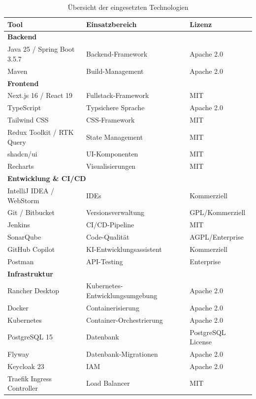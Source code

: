 \begin{table}[H]
\centering
\footnotesize
{}
\begin{tabularx}{\textwidth}{|p{3cm}|X|p{2.5cm}|}
\hline
\rowcolor{EDAGDunkelgrau!10}
\textbf{Tool} & \textbf{Einsatzbereich} & \textbf{Lizenz} \\ \hline

\multicolumn{3}{|l|}{\textbf{Backend}} \\ \hline
Java 25 / Spring Boot 3.5.7 & Backend-Framework & Apache 2.0 \\ \hline
Maven & Build-Management & Apache 2.0 \\ \hline

\multicolumn{3}{|l|}{\textbf{Frontend}} \\ \hline
Next.js 16 / React 19 & Fullstack-Framework & MIT \\ \hline
TypeScript & Typsichere Sprache & Apache 2.0 \\ \hline
Tailwind CSS & CSS-Framework & MIT \\ \hline
Redux Toolkit / RTK Query & State Management & MIT \\ \hline
shadcn/ui & UI-Komponenten & MIT \\ \hline
Recharts & Visualisierungen & MIT \\ \hline

\multicolumn{3}{|l|}{\textbf{Entwicklung \& CI/CD}} \\ \hline
IntelliJ IDEA / WebStorm & IDEs & Kommerziell \\ \hline
Git / Bitbucket & Versionsverwaltung & GPL/Kommerziell \\ \hline
Jenkins & CI/CD-Pipeline & MIT \\ \hline
SonarQube & Code-Qualität & AGPL/Enterprise \\ \hline
GitHub Copilot & KI-Entwicklungsassistent & Kommerziell \\ \hline
Postman & API-Testing & Enterprise \\ \hline

\multicolumn{3}{|l|}{\textbf{Infrastruktur}} \\ \hline
Rancher Desktop & Kubernetes-Entwicklungsumgebung & Apache 2.0 \\ \hline
Docker & Containerisierung & Apache 2.0 \\ \hline
Kubernetes & Container-Orchestrierung & Apache 2.0 \\ \hline
PostgreSQL 15 & Datenbank & PostgreSQL License \\ \hline
Flyway & Datenbank-Migrationen & Apache 2.0 \\ \hline
Keycloak 23 & IAM & Apache 2.0 \\ \hline
Traefik Ingress Controller & Load Balancer & MIT \\ \hline

\end{tabularx}
\caption{Übersicht der eingesetzten Technologien}
\label{tab:technologien_detail}
\end{table}

